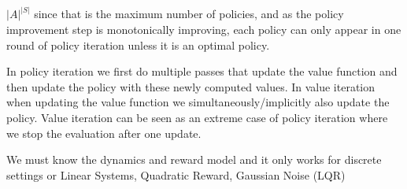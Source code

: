 \begin{enumerate}
     \newline
      $|A|^{|S|}$ since that is the maximum number of policies, and as the policy improvement step is monotonically improving, each policy can only appear in one round of policy iteration unless it is an optimal policy.
    
     \newline In policy iteration we first do multiple passes that update 
    the value function and then update the policy with these newly computed values. In 
    value iteration when updating the value function we simultaneously/implicitly also 
    update the policy. Value iteration can be seen as an extreme case of policy 
    iteration where we stop the evaluation after one update.  
    
    \newline
    We must know the dynamics and reward model and it only works for discrete settings or 
    Linear Systems, Quadratic Reward, Gaussian Noise (LQR)
\end{enumerate}
